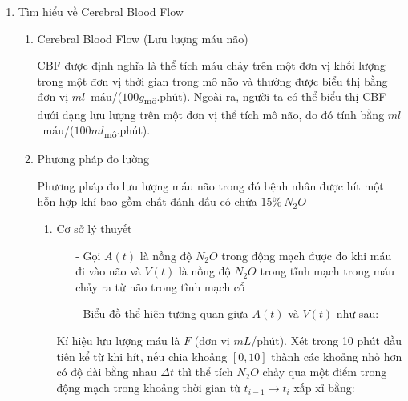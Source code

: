 \documentclass[12pt,a4paper]{article}
\begin{document}
\tableofcontents

\newpage
\begin{enumerate}[I/]
	\item Tìm hiểu về Cerebral Blood Flow
	    \begin{enumerate}[1/]
			\item Cerebral Blood Flow (Lưu lượng máu não)
			\begin{flushleft}
				CBF được định nghĩa là thể tích máu chảy trên một đơn vị khối lượng trong
				một đơn vị thời gian trong mô não và thường được biểu thị bằng đơn vị $ml$\ máu/($100g$\textsubscript{mô}.phút). 
				Ngoài ra, người ta có thể biểu thị CBF dưới dạng lưu lượng trên một đơn vị thể tích mô não, 
				do đó tính bằng $ml$\ máu/($100ml$\textsubscript{mô}.phút).
			\end{flushleft}
			\item Phương pháp đo lường
			\begin{flushleft}
				Phương pháp đo lưu lượng máu não trong đó bệnh nhân được 
				hít một hỗn hợp khí bao gồm chất đánh dấu có chứa $15\%\ N_2O$
			\end{flushleft}
				\begin{enumerate}[a/]
					\item Cơ sở lý thuyết
					\begin{itemize}
						\item[-] Gọi $A(t)$ là nồng độ $N_2O$ trong động mạch được đo khi máu đi vào não và $V(t)$ là nồng độ $N_2O$ trong tĩnh mạch trong máu chảy ra từ não trong tĩnh mạch cổ
						\item[-] Biểu đồ thể hiện tương quan giữa $A(t)$ và $V(t)$ như sau:
					\end{itemize}
					\begin{flushleft}
						Kí hiệu lưu lượng máu là $F$ (đơn vị $mL$/phút). Xét trong 10 phút đầu tiên
						kể từ khi hít, nếu chia khoảng $\left[0,10\right]$ thành các khoảng nhỏ hơn có độ dài bằng nhau $\Delta t$ thì 
						thể tích $N_2O$ chảy qua một điểm trong động mạch trong khoảng thời gian từ $t_{i-1} \to t_i$ xấp xỉ bằng:


\end{flushleft}
\end{enumerate}
\end{enumerate}
\end{enumerate}
\end{document}
